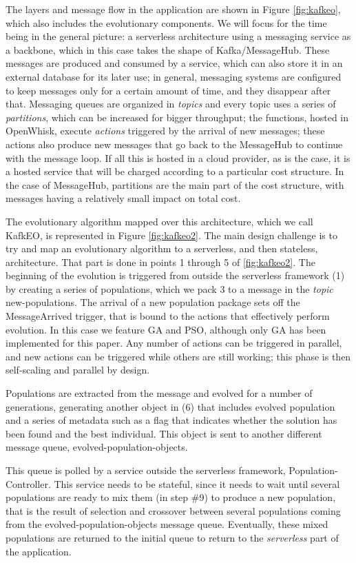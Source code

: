 \documentclass[sigconf]{acmart}
\begin{document}
The layers and message flow in the application are shown in Figure
\ref{fig:kafkeo}, which also includes the evolutionary components. We
will focus for the time being in the general picture: a serverless
architecture using  a messaging service as a backbone, which in this case
takes the shape of Kafka/MessageHub. These messages are produced and
consumed by a service, which can also store it in an external database
for its later use; in general, messaging systems are configured to
keep messages only for a certain amount of time, and they disappear
after that. Messaging queues are organized in {\em topics} and every
topic uses a series of {\em partitions}, which can be increased for
bigger throughput; the
functions, hosted in OpenWhisk, execute {\em actions} triggered by the
arrival of new messages; these actions also produce new messages that
go back to the MessageHub to continue with the message loop. If all
this is hosted in a cloud provider, as is the case, it is a hosted
service that will be charged according to a particular cost
structure. In the case of MessageHub, partitions are the main part of
the cost structure, with messages having a relatively small impact on
total cost. 

The evolutionary algorithm mapped over this architecture, which we
call KafkEO, is represented in Figure \ref{fig:kafkeo2}. The main
design challenge is to try and map an evolutionary algorithm to a
serverless, and then stateless, architecture. That part is done in
points 1 through 5 of  \ref{fig:kafkeo2}. The beginning of the
evolution is triggered from outside the serverless framework (1) by
creating a series of populations, which we pack 3 to a message in the
{\em topic} {\sf new-populations}. The arrival of a new population
package sets off the {\sf MessageArrived} trigger, that is bound to
the actions that effectively perform evolution. In this case we
feature GA and PSO, although only GA has been implemented for this
paper. Any number of actions can be triggered in parallel, and new
actions can be triggered while others are still working; this phase is
then self-scaling and parallel by design.

Populations are extracted from the message and evolved for a number of
generations, generating another object in (6) that includes evolved
population and a series of metadata such as a flag that indicates
whether the solution has been found and the best individual. This
object is sent to another different message queue, {\sf
  evolved-population-objects}.

This queue is polled by a service outside the serverless framework,
{\sf Population-Controller}. This service needs to be stateful, since
it needs to wait until several populations are ready to mix them (in
step \#9) to produce a new population, that is the result of selection
and crossover between several populations coming from the {\sf
  evolved-population-objects} message queue. Eventually, these mixed
populations are returned to the initial queue to return to the {\em
  serverless} part of the application.
\end{document}
